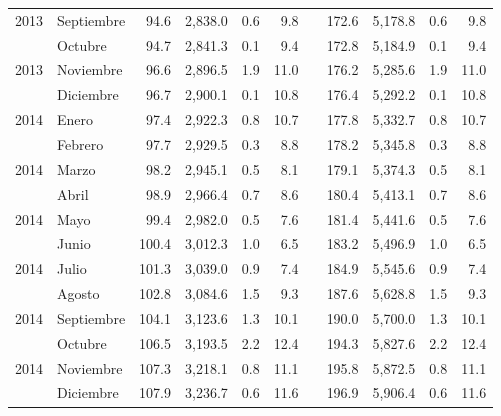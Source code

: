 \begin{center}
\begin{longtable}{llrrrrrrrrr}
		\multicolumn{1}{l}{	2013	}&	Septiembre	&	 94.6 	&	 2,838.0 	&	 0.6 	&	 9.8 	&  &	 172.6 	&	 5,178.8 	&	 0.6 	&	 9.8 	\\
		\rowcolor{color1!5!white}\multicolumn{1}{l}{	2013	}&	Octubre	&	 94.7 	&	 2,841.3 	&	 0.1 	&	 9.4 	&  &	 172.8 	&	 5,184.9 	&	 0.1 	&	 9.4 	\\
		\multicolumn{1}{l}{	2013	}&	Noviembre	&	 96.6 	&	 2,896.5 	&	 1.9 	&	 11.0 	&  &	 176.2 	&	 5,285.6 	&	 1.9 	&	 11.0 	\\
		\rowcolor{color1!5!white}\multicolumn{1}{l}{	2013	}&	Diciembre	&	 96.7 	&	 2,900.1 	&	 0.1 	&	 10.8 	&  &	 176.4 	&	 5,292.2 	&	 0.1 	&	 10.8 	\\
		\multicolumn{1}{l}{	2014	}&	Enero	&	 97.4 	&	 2,922.3 	&	 0.8 	&	 10.7 	&  &	 177.8 	&	 5,332.7 	&	 0.8 	&	 10.7 	\\
		\rowcolor{color1!5!white}\multicolumn{1}{l}{	2014	}&	Febrero	&	 97.7 	&	 2,929.5 	&	 0.3 	&	 8.8 	&  &	 178.2 	&	 5,345.8 	&	 0.3 	&	 8.8 	\\
		\multicolumn{1}{l}{	2014	}&	Marzo	&	 98.2 	&	 2,945.1 	&	 0.5 	&	 8.1 	&  &	 179.1 	&	 5,374.3 	&	 0.5 	&	 8.1 	\\
		\rowcolor{color1!5!white}\multicolumn{1}{l}{	2014	}&	Abril	&	 98.9 	&	 2,966.4 	&	 0.7 	&	 8.6 	&  &	 180.4 	&	 5,413.1 	&	 0.7 	&	 8.6 	\\
		\multicolumn{1}{l}{	2014	}&	Mayo	&	 99.4 	&	 2,982.0 	&	 0.5 	&	 7.6 	&  &	 181.4 	&	 5,441.6 	&	 0.5 	&	 7.6 	\\
		\rowcolor{color1!5!white}\multicolumn{1}{l}{	2014	}&	Junio	&	 100.4 	&	 3,012.3 	&	 1.0 	&	 6.5 	&  &	 183.2 	&	 5,496.9 	&	 1.0 	&	 6.5 	\\
		\multicolumn{1}{l}{	2014	}&	Julio	&	 101.3 	&	 3,039.0 	&	 0.9 	&	 7.4 	&  &	 184.9 	&	 5,545.6 	&	 0.9 	&	 7.4 	\\
		\rowcolor{color1!5!white}\multicolumn{1}{l}{	2014	}&	Agosto	&	 102.8 	&	 3,084.6 	&	 1.5 	&	 9.3 	&  &	 187.6 	&	 5,628.8 	&	 1.5 	&	 9.3 	\\
		\multicolumn{1}{l}{	2014	}&	Septiembre	&	 104.1 	&	 3,123.6 	&	 1.3 	&	 10.1 	&  &	 190.0 	&	 5,700.0 	&	 1.3 	&	 10.1 	\\
		\rowcolor{color1!5!white}\multicolumn{1}{l}{	2014	}&	Octubre	&	 106.5 	&	 3,193.5 	&	 2.2 	&	 12.4 	&  &	 194.3 	&	 5,827.6 	&	 2.2 	&	 12.4 	\\
		\multicolumn{1}{l}{	2014	}&	Noviembre	&	 107.3 	&	 3,218.1 	&	 0.8 	&	 11.1 	&  &	 195.8 	&	 5,872.5 	&	 0.8 	&	 11.1 	\\
		\rowcolor{color1!5!white}\multicolumn{1}{l}{	2014	}&	Diciembre	&	 107.9 	&	 3,236.7 	&	 0.6 	&	 11.6 	&  &	 196.9 	&	 5,906.4 	&	 0.6 	&	 11.6 	\\

\end{longtable}
\end{center}
